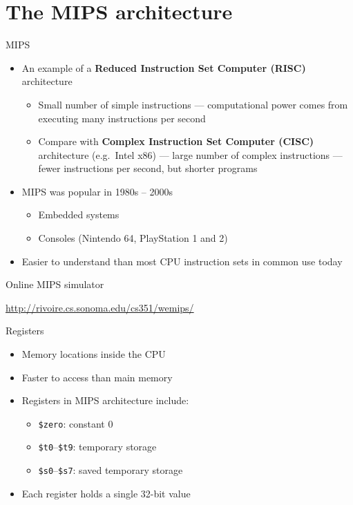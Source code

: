 \part{The MIPS architecture}
\frame{\partpage}

\begin{frame}{MIPS}
	\begin{itemize}
		\pause\item An example of a \textbf{Reduced Instruction Set Computer (RISC)} architecture
			\begin{itemize}
				\pause\item Small number of simple instructions --- computational power comes from executing
					many instructions per second
				\pause\item Compare with \textbf{Complex Instruction Set Computer (CISC)} architecture (e.g.\ Intel x86)
					--- large number of complex instructions
					--- fewer instructions per second, but shorter programs
			\end{itemize}
		\pause\item MIPS was popular in 1980s -- 2000s
			\begin{itemize}
				\pause\item Embedded systems
				\pause\item Consoles (Nintendo 64, PlayStation 1 and 2)
			\end{itemize}
		\pause\item Easier to understand than most CPU instruction sets in common use today
	\end{itemize}
\end{frame}

\begin{frame}{Online MIPS simulator}
	\begin{center}
		\url{http://rivoire.cs.sonoma.edu/cs351/wemips/}
	\end{center}
\end{frame}

\begin{frame}{Registers}
	\begin{itemize}
		\pause\item Memory locations inside the CPU
		\pause\item Faster to access than main memory
		\pause\item Registers in MIPS architecture include:
			\begin{itemize}
				\pause\item \lstinline{$zero}: constant 0
				\pause\item \lstinline{$t0}--\lstinline{$t9}: temporary storage
				\pause\item \lstinline{$s0}--\lstinline{$s7}: saved temporary storage
			\end{itemize}
		\pause\item Each register holds a single 32-bit value
	\end{itemize}
\end{frame}

